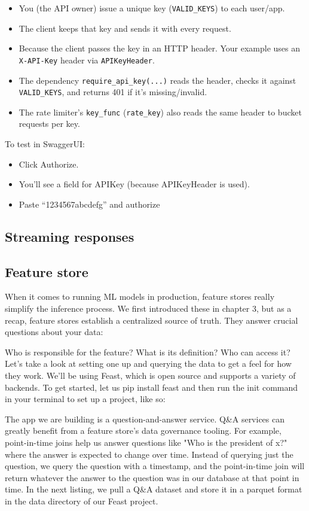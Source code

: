 \begin{itemize}
	\item You (the API owner) issue a unique key (\ie \texttt{VALID\_KEYS}) to each user/app.
	\item The client keeps that key and sends it with every request.
	\item Because the client passes the key in an HTTP header. Your example uses an \texttt{X-API-Key} header via \texttt{APIKeyHeader}.
	\item The dependency \texttt{require\_api\_key(...)} reads the header, checks it against \texttt{VALID\_KEYS}, and returns 401 if it's missing/invalid.
	\item The rate limiter's \texttt{key\_func} (\texttt{rate\_key}) also reads the same header to bucket requests per key.
\end{itemize}
To test in SwaggerUI:
\begin{itemize}
	\item Click Authorize.
	\item You'll see a field for APIKey (because APIKeyHeader is used).
	\item Paste ``1234567abcdefg'' and authorize
\end{itemize}

\subsection{Streaming responses}

\subsection{Feature store}
When it comes to running ML models in production, feature stores really simplify the inference process. We first introduced these in chapter 3, but as a recap, feature stores establish a centralized source of truth. They answer crucial questions about your data:

Who is responsible for the feature? What is its definition? Who can access it? Let's take a look at setting one up and querying the data to get a feel for how they work. We'll be using Feast, which is open source and supports a variety of backends. To get started, let us pip install feast and then run the init command in your terminal to set up a project, like so:

The app we are building is a question-and-answer service. Q\&A services can greatly benefit from a feature store's data governance tooling. For example, point-in-time joins help us answer questions like "Who is the president of x?" where the answer is expected to change over time. Instead of querying just the question, we query the question with a timestamp, and the point-in-time join will return whatever the answer to the question was in our database at that point in time. In the next listing, we pull a Q\&A dataset and store it in a parquet format in the data directory of our Feast project.

